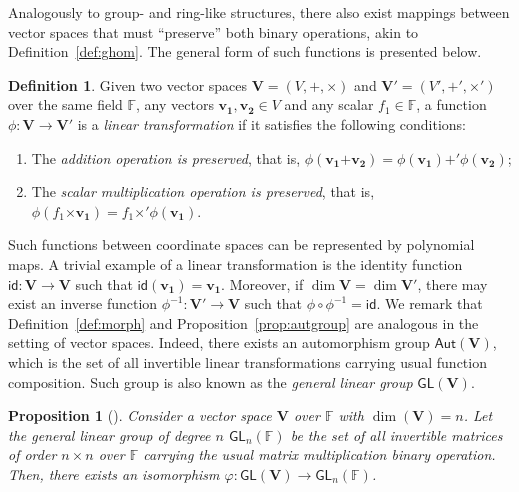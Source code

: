 \documentclass[draft, 12pt, a4paper, oneside]{memoir}
\newtheorem{proposition}[theorem]{Proposition}
\theoremstyle{definition}
\newtheorem{definition}[theorem]{Definition}
\begin{document}
Analogously to group- and ring-like structures, there also exist mappings between vector spaces that must ``preserve'' both binary operations, akin to Definition~\ref{def:ghom}. The general form of such functions is presented below.

\begin{definition}
  Given two vector spaces $\mathbf{V} = (V, \bm{+}, \bm{\times})$ and $\mathbf{V'} = (V', \bm{+'}, \bm{\times'})$ over the same field $\mathbb{F}$, any vectors $\mathbf{v_{1}}, \mathbf{v_{2}} \in V$ and any scalar $f_{1} \in \mathbb{F}$, a function $\phi : \mathbf{V} \to \mathbf{V'}$ is a \emph{linear transformation} if it satisfies the following conditions:
  
  \begin{enumerate}
    \item The \emph{addition operation is preserved}, that is, $\phi(\mathbf{v_{1}} \bm{+} \mathbf{v_{2}}) = \phi(\mathbf{v_{1}}) \bm{+'} \phi(\mathbf{v_{2}})$;
    \item The \emph{scalar multiplication operation is preserved}, that is, $\phi(f_{1} \bm{\times} \mathbf{v_{1}}) = f_{1} \bm{\times'} \phi(\mathbf{v_{1}})$.
  \end{enumerate} 
\end{definition}

Such functions between coordinate spaces can be represented by polynomial maps. A trivial example of a linear transformation is the identity function $\mathsf{id} : \mathbf{V} \to \mathbf{V}$ such that $\mathsf{id}(\mathbf{v_{1}}) = \mathbf{v_{1}}$. Moreover, if $\dim \mathbf{V} = \dim \mathbf{V'}$, there may exist an inverse function $\phi^{-1} : \mathbf{V'} \to \mathbf{V}$ such that $\phi \circ \phi^{-1} = \mathsf{id}$. We remark that Definition~\ref{def:morph} and Proposition~\ref{prop:autgroup} are analogous in the setting of vector spaces. Indeed, there exists an automorphism group $\mathsf{Aut}(\mathbf{V})$, which is the set of all invertible linear transformations carrying usual function composition. Such group is also known as the \emph{general linear group} $\mathsf{GL}(\mathbf{V})$.

\begin{proposition}[{\cite[p. 418, Cor. 14]{Dummit:2003}}]
  Consider a vector space $\mathbf{V}$ over $\mathbb{F}$ with $\dim(\mathbf{V}) = n$. Let the \emph{general linear group of degree $n$ $\mathsf{GL}_{n}(\mathbb{F})$} be the set of all invertible matrices of order $n \times n$ over $\mathbb{F}$ carrying the usual matrix multiplication binary operation. Then, there exists an isomorphism $\varphi : \mathsf{GL}(\mathbf{V}) \to \mathsf{GL}_{n}(\mathbb{F})$.
\end{proposition}
\end{document}
